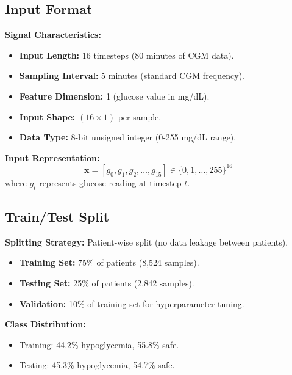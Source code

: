 \documentclass[11pt, a4paper]{article}
\newcommand{\vect}[1]{\mathbf{#1}}
\begin{document}
\subsection{Input Format}

\textbf{Signal Characteristics:}
\begin{itemize}
    \item \textbf{Input Length:} 16 timesteps (80 minutes of CGM data).
    \item \textbf{Sampling Interval:} 5 minutes (standard CGM frequency).
    \item \textbf{Feature Dimension:} 1 (glucose value in mg/dL).
    \item \textbf{Input Shape:} $(16 \times 1)$ per sample.
    \item \textbf{Data Type:} 8-bit unsigned integer (0-255 mg/dL range).
\end{itemize}

\textbf{Input Representation:}
\begin{equation}
\vect{x} = [g_0, g_1, g_2, \ldots, g_{15}] \in \{0, 1, \ldots, 255\}^{16}
\end{equation}
where $g_t$ represents glucose reading at timestep $t$.

\subsection{Train/Test Split}

\textbf{Splitting Strategy:} Patient-wise split (no data leakage between patients).

\begin{itemize}
    \item \textbf{Training Set:} 75\% of patients (8,524 samples).
    \item \textbf{Testing Set:} 25\% of patients (2,842 samples).
    \item \textbf{Validation:} 10\% of training set for hyperparameter tuning.
\end{itemize}

\textbf{Class Distribution:}
\begin{itemize}
    \item Training: 44.2\% hypoglycemia, 55.8\% safe.
    \item Testing: 45.3\% hypoglycemia, 54.7\% safe.
\end{itemize}

\end{document}
